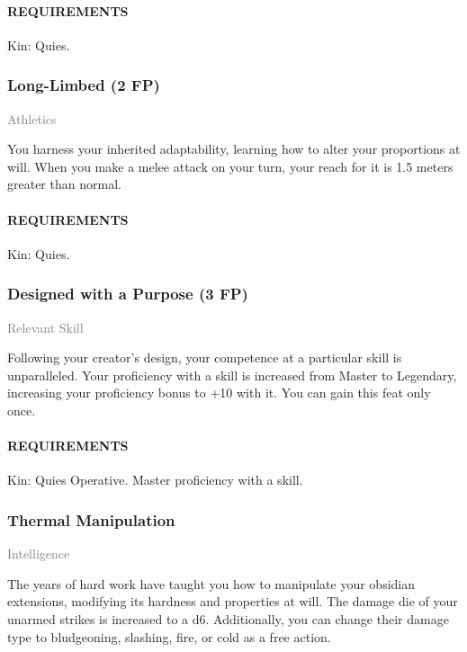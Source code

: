     \paragraph{REQUIREMENTS} Kin: Quies.

    \subsubsection{Long-Limbed (2 FP)} \label{feat::longlimbed}
    \small{\textcolor{gray}{Athletics}}

    \normalsize
    You harness your inherited adaptability, learning how to alter your proportions at will.
    When you make a melee attack on your turn, your reach for it is 1.5 meters greater than normal.
    \paragraph{REQUIREMENTS} Kin: Quies.

    \subsubsection{Designed with a Purpose (3 FP)} \label{feat::designedwithapurpose}
    \small{\textcolor{gray}{Relevant Skill}}

    \normalsize
    Following your creator's design, your competence at a particular skill is unparalleled.
    Your proficiency with a skill is increased from Master to Legendary, increasing your proficiency bonus to +10 with it.
    You can gain this feat only once.
    \paragraph{REQUIREMENTS} Kin: Quies Operative. Master proficiency with a skill.
    \subsubsection{Thermal Manipulation} \label{feat::thermalmanipulation}
    \small{\textcolor{gray}{Intelligence}}

    \normalsize
    The years of hard work have taught you how to manipulate your obsidian extensions, modifying its hardness and properties at will.
    The damage die of your unarmed strikes is increased to a d6.
    Additionally, you can change their damage type to bludgeoning, slashing, fire, or cold as a free action.
